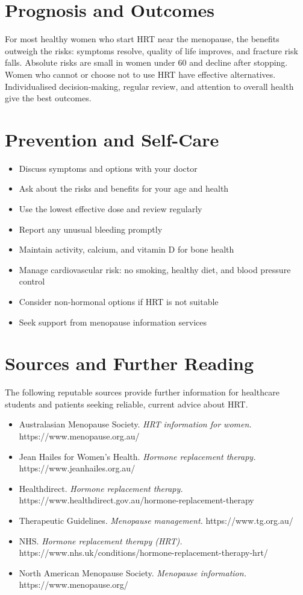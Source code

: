 \section*{Prognosis and Outcomes}
For most healthy women who start HRT near the menopause, the benefits outweigh the risks: symptoms resolve, quality of life improves, and fracture risk falls. Absolute risks are small in women under 60 and decline after stopping. Women who cannot or choose not to use HRT have effective alternatives. Individualised decision-making, regular review, and attention to overall health give the best outcomes.

\section*{Prevention and Self-Care}
\begin{itemize}
    \item Discuss symptoms and options with your doctor
    \item Ask about the risks and benefits for your age and health
    \item Use the lowest effective dose and review regularly
    \item Report any unusual bleeding promptly
    \item Maintain activity, calcium, and vitamin D for bone health
    \item Manage cardiovascular risk: no smoking, healthy diet, and blood pressure control
    \item Consider non-hormonal options if HRT is not suitable
    \item Seek support from menopause information services
\end{itemize}

\section*{Sources and Further Reading}
The following reputable sources provide further information for healthcare students and patients seeking reliable, current advice about HRT.

\begin{itemize}
    \item Australasian Menopause Society. \textit{HRT information for women.} https://www.menopause.org.au/
    \item Jean Hailes for Women's Health. \textit{Hormone replacement therapy.} https://www.jeanhailes.org.au/
    \item Healthdirect. \textit{Hormone replacement therapy.} https://www.healthdirect.gov.au/hormone-replacement-therapy
    \item Therapeutic Guidelines. \textit{Menopause management.} https://www.tg.org.au/
    \item NHS. \textit{Hormone replacement therapy (HRT).} https://www.nhs.uk/conditions/hormone-replacement-therapy-hrt/
    \item North American Menopause Society. \textit{Menopause information.} https://www.menopause.org/
\end{itemize}
